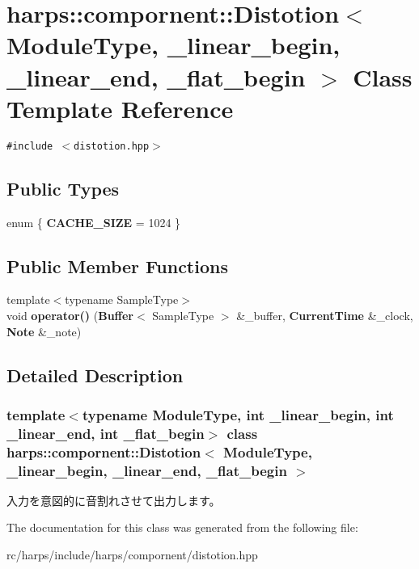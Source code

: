 \section{harps::compornent::Distotion$<$ ModuleType, \_\-linear\_\-begin, \_\-linear\_\-end, \_\-flat\_\-begin $>$ Class Template Reference}
\label{classharps_1_1compornent_1_1Distotion}
{\tt \#include $<$distotion.hpp$>$}

\subsection*{Public Types}
\begin{CompactItemize}
\item 
enum \{ \textbf{CACHE\_\-SIZE} =  1024
 \}
\end{CompactItemize}
\subsection*{Public Member Functions}
\begin{CompactItemize}
\item 
{\footnotesize template$<$typename SampleType$>$ }\\void \textbf{operator()} ({\bf Buffer}$<$ SampleType $>$ \&\_\-buffer, {\bf CurrentTime} \&\_\-clock, {\bf Note} \&\_\-note)\label{classharps_1_1compornent_1_1Distotion_a77b7866fa3aa4951f0c3841bcb26655}

\end{CompactItemize}


\subsection{Detailed Description}
\subsubsection*{template$<$typename ModuleType, int \_\-linear\_\-begin, int \_\-linear\_\-end, int \_\-flat\_\-begin$>$ class harps::compornent::Distotion$<$ ModuleType, \_\-linear\_\-begin, \_\-linear\_\-end, \_\-flat\_\-begin $>$}

入力を意図的に音割れさせて出力します。 

The documentation for this class was generated from the following file:\begin{CompactItemize}
\item 
rc/harps/include/harps/compornent/distotion.hpp\end{CompactItemize}
